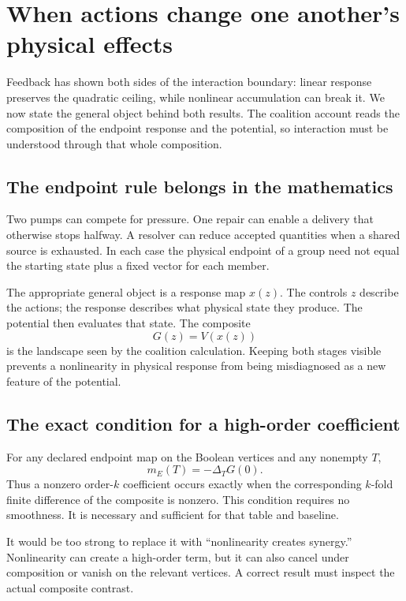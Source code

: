\chapter{When actions change one another's physical effects}\label{ch:composite}

Feedback has shown both sides of the interaction boundary: linear response preserves the quadratic ceiling, while nonlinear accumulation can break it. We now state the general object behind both results. The coalition account reads the composition of the endpoint response and the potential, so interaction must be understood through that whole composition.


\section{The endpoint rule belongs in the mathematics}
Two pumps can compete for pressure. One repair can enable a delivery that otherwise stops halfway. A resolver can reduce accepted quantities when a shared source is exhausted. In each case the physical endpoint of a group need not equal the starting state plus a fixed vector for each member.

The appropriate general object is a response map $x(z)$. The controls $z$ describe the actions; the response describes what physical state they produce. The potential then evaluates that state. The composite
\begin{equation}\label{eq:composite-map}
 G(z)=V(x(z))
\end{equation}
is the landscape seen by the coalition calculation. Keeping both stages visible prevents a nonlinearity in physical response from being misdiagnosed as a new feature of the potential.

\section{The exact condition for a high-order coefficient}
For any declared endpoint map on the Boolean vertices and any nonempty $T$,
\begin{equation}\label{eq:composite-difference}
 m_E(T)=-\Delta_TG(0).
\end{equation}
Thus a nonzero order-$k$ coefficient occurs exactly when the corresponding $k$-fold finite difference of the composite is nonzero. This condition requires no smoothness. It is necessary and sufficient for that table and baseline.

It would be too strong to replace it with ``nonlinearity creates synergy.'' Nonlinearity can create a high-order term, but it can also cancel under composition or vanish on the relevant vertices. A correct result must inspect the actual composite contrast.

